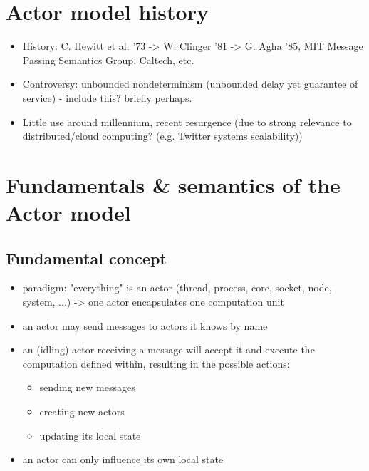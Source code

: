\documentclass[A4]{article}
\begin{document}
\section{Actor model history}
\begin{itemize}
\item History: C. Hewitt et al. '73 -> W. Clinger '81 -> G. Agha '85, MIT Message Passing Semantics Group, Caltech, etc.
\item Controversy: unbounded nondeterminism (unbounded delay yet guarantee of service) - include this? briefly perhaps.
\item Little use around millennium, recent resurgence (due to strong relevance to distributed/cloud computing? (e.g. Twitter systems scalability))
\end{itemize}

\section{Fundamentals \& semantics of the Actor model}
\subsection{Fundamental concept}
\begin{itemize}
\item paradigm: "everything" is an actor (thread, process, core, socket, node, system, ...) -> one actor encapsulates one computation unit
\item an actor may send messages to actors it knows by name
\item an (idling) actor receiving a message will accept it and execute the computation defined within, resulting in the possible actions:
	\begin{itemize}
	\item sending new messages
	\item creating new actors
	\item updating its local state
	\end{itemize}
\item an actor can only influence its own local state
\end{itemize}
\end{document}
